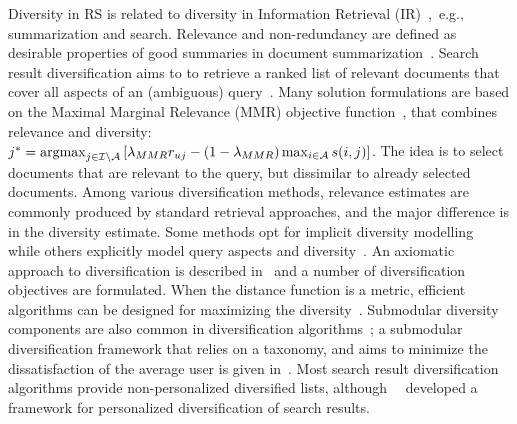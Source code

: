 
Diversity in RS is related to diversity  in Information Retrieval (IR)~\cite{vargas2011intent,Castells2015},~e.g., summarization and search. %
Relevance and non-redundancy are defined as desirable properties of good summaries in document summarization~\cite{lin2011class}.
Search result diversification aims to to retrieve a ranked list of relevant documents that cover all aspects of an (ambiguous) query~\cite{agrawal2009diversifying, carbonell1998use,drosou2010search, gollapudi2009axiomatic}. Many solution formulations are based on the Maximal Marginal Relevance (MMR) objective function~\cite{carbonell1998use}, that combines relevance and diversity: $j^* = \operatorname*{argmax}_{j \in \mathcal{I} \setminus \mathcal{A} } \left[  \lambda_{MMR} r_{uj} - (1-\lambda_{MMR}) \max_{i \in \mathcal{A}} s(i, j)\right]$. %
The idea is to  select documents that are relevant to the query, but dissimilar to already selected documents. Among various diversification methods, relevance estimates are commonly produced by standard retrieval approaches, and the major difference is in the diversity estimate. Some methods opt for implicit diversity modelling~\cite{gollapudi2009axiomatic} while others explicitly model query aspects and diversity~\cite{agrawal2009diversifying,santos2010exploiting}. An axiomatic approach to diversification is described in~\cite{gollapudi2009axiomatic} and a number of diversification  objectives are formulated. When the distance function is a metric, efficient algorithms can be designed for maximizing the diversity~\cite{gollapudi2009axiomatic}.  
Submodular diversity components are also common in diversification algorithms~\cite{abbassi2013diversity,agrawal2009diversifying};  a  submodular diversification framework that relies on a taxonomy, and aims to minimize the dissatisfaction of the average user is given in~\cite{agrawal2009diversifying}. Most search result diversification algorithms provide non-personalized diversified lists, although~~\cite{vallet2012personalized} developed a framework for personalized diversification of search results.
\fi


